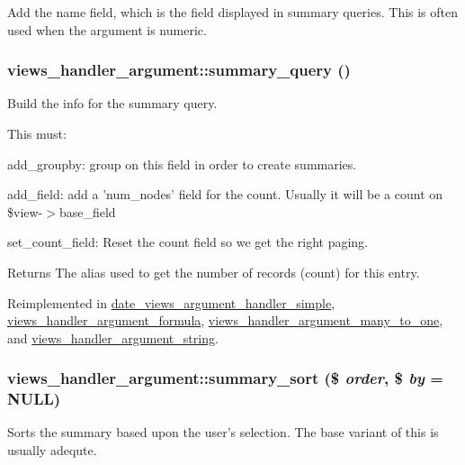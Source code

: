 Add the name field, which is the field displayed in summary queries. This is often used when the argument is numeric. \hypertarget{classviews__handler__argument_a1dd6cc301b1c7c1c6829c59eb641a883}{
\subsubsection[{summary\_\-query}]{\setlength{\rightskip}{0pt plus 5cm}views\_\-handler\_\-argument::summary\_\-query ()}}
\label{classviews__handler__argument_a1dd6cc301b1c7c1c6829c59eb641a883}
Build the info for the summary query.

This must:
\begin{DoxyItemize}
\item add\_\-groupby: group on this field in order to create summaries.
\item add\_\-field: add a 'num\_\-nodes' field for the count. Usually it will be a count on \$view-\/$>$base\_\-field
\item set\_\-count\_\-field: Reset the count field so we get the right paging.
\end{DoxyItemize}

\begin{DoxyReturn}{Returns}
The alias used to get the number of records (count) for this entry. 
\end{DoxyReturn}


Reimplemented in \hyperlink{classdate__views__argument__handler__simple_abfe22d750f3ce21303be3343499757c1}{date\_\-views\_\-argument\_\-handler\_\-simple}, \hyperlink{classviews__handler__argument__formula_a377fd11d178f88a0bd68c2ec9d6f9e00}{views\_\-handler\_\-argument\_\-formula}, \hyperlink{classviews__handler__argument__many__to__one_a320b34f2327cb15467353d2534d71ddd}{views\_\-handler\_\-argument\_\-many\_\-to\_\-one}, and \hyperlink{classviews__handler__argument__string_a829ad5356d65f02a75af5d1e8374292b}{views\_\-handler\_\-argument\_\-string}.\hypertarget{classviews__handler__argument_aa5d1fffe25845774985e524b2fd546c5}{
\subsubsection[{summary\_\-sort}]{\setlength{\rightskip}{0pt plus 5cm}views\_\-handler\_\-argument::summary\_\-sort (\$ {\em order}, \/  \$ {\em by} = {\ttfamily NULL})}}
\label{classviews__handler__argument_aa5d1fffe25845774985e524b2fd546c5}
Sorts the summary based upon the user's selection. The base variant of this is usually adequte.


